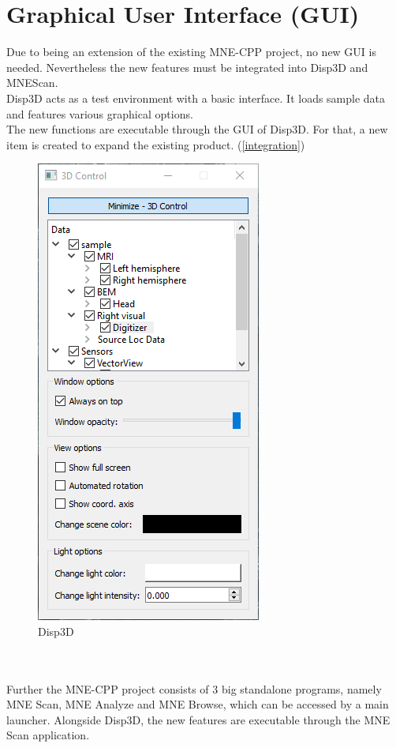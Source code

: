 \section{Graphical User Interface (GUI)}

Due to being an extension of the existing MNE-CPP project, no new GUI is needed. Nevertheless the new features must be integrated into Disp3D and MNEScan. \\

Disp3D acts as a test environment with a basic interface. It loads sample data and features various graphical options. \\
The new functions are executable through the GUI of Disp3D. For that, a new item is created to expand the existing product. (\ref{integration}) \\ 
	
\begin{figure}
	
	\begin{center}
		
		\includegraphics[scale=0.5]{Figures/Disp3D.PNG}
	
	\end{center}
	
	\caption{Disp3D}

\end{figure}
~\\
~\\
Further the MNE-CPP project consists of 3 big standalone programs, namely MNE Scan, MNE Analyze and MNE Browse, which can be accessed by a main launcher. Alongside Disp3D, the new features are executable through the MNE Scan application.


